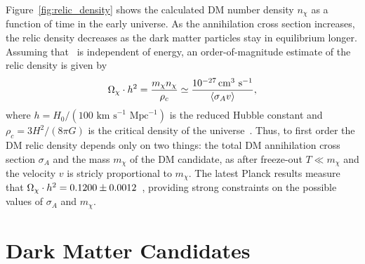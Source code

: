 Figure~\ref{fig:relic_density} shows the calculated DM number density $n_\chi$ as a function of time in the early universe.
As the annihilation cross section increases, the relic density decreases as the dark matter particles stay in equilibrium longer.
Assuming that \sigmav\ is independent of energy, an order-of-magnitude estimate of the relic density is given by
\begin{equation}
  \label{eqn:relic_density}
  \Omega_\chi \cdot h^2 = \frac{m_\chi n_\chi}{\rho_c} \simeq \frac{10^{-27} \,\text{cm}^{3}\text{ s}^{-1}}{\langle \sigma_A v \rangle},
\end{equation}
where $h = H_0/(100 \text{ km s}^{-1}\text{ Mpc}^{-1})$ is the reduced Hubble constant and $\rho_c = 3H^2/(8\pi G)$ is the critical density of the universe~\cite{Jungman1996}.
Thus, to first order the DM relic density depends only on two things: the total DM annihilation cross section $\sigma_A$ and the mass $m_\chi$ of the DM candidate, as after freeze-out $T \ll m_\chi$ and the velocity $v$ is stricly proportional to $m_\chi$. 
The latest Planck results measure that $\Omega_\chi \cdot h^2 = 0.1200 \pm 0.0012$~\cite{Planck2018}, providing strong constraints on the possible values of $\sigma_A$ and $m_\chi$.

\section{Dark Matter Candidates}
\label{sec:dm_cand}

